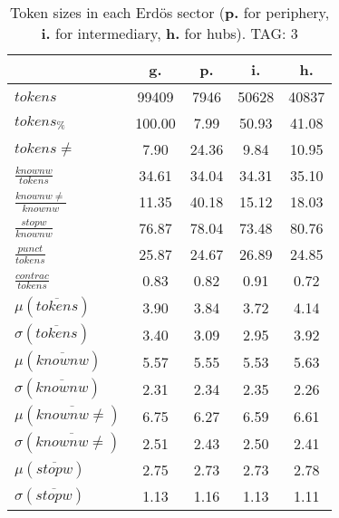 \begin{table}[h!]
\begin{center}
\begin{tabular}{| l || c | c | c | c |}\hline
 & {\bf g.} & {\bf p.} & {\bf i.} & {\bf h.} \\\hline\hline
$tokens$ & 99409  & 7946  & 50628  & 40837 \\
$tokens_{\%}$ & 100.00  & 7.99  & 50.93  & 41.08 \\
$tokens \neq$ & 7.90  & 24.36  & 9.84  & 10.95 \\\hline
$\frac{knownw}{tokens}$ & 34.61  & 34.04  & 34.31  & 35.10 \\
$\frac{knownw \neq}{knownw}$ & 11.35  & 40.18  & 15.12  & 18.03 \\\hline
$\frac{stopw}{knownw}$ & 76.87  & 78.04  & 73.48  & 80.76 \\
$\frac{punct}{tokens}$ & 25.87  & 24.67  & 26.89  & 24.85 \\
$\frac{contrac}{tokens}$ & 0.83  & 0.82  & 0.91  & 0.72 \\\hline\hline
$\mu(\overline{tokens})$ & 3.90  & 3.84  & 3.72  & 4.14 \\
$\sigma(\overline{tokens})$ & 3.40  & 3.09  & 2.95  & 3.92 \\\hline
$\mu(\overline{knownw})$ & 5.57  & 5.55  & 5.53  & 5.63 \\
$\sigma(\overline{knownw})$ & 2.31  & 2.34  & 2.35  & 2.26 \\\hline
$\mu(\overline{knownw \neq})$ & 6.75  & 6.27  & 6.59  & 6.61 \\
$\sigma(\overline{knownw \neq})$ & 2.51  & 2.43  & 2.50  & 2.41 \\\hline
$\mu(\overline{stopw})$ & 2.75  & 2.73  & 2.73  & 2.78 \\
$\sigma(\overline{stopw})$ & 1.13  & 1.16  & 1.13  & 1.11 \\\hline
\end{tabular}
\caption{Token sizes in each Erd\"os sector ({{\bf p.}} for periphery, {{\bf i.}} for intermediary, {{\bf h.}} for hubs). TAG: 3}
\end{center}
\end{table}